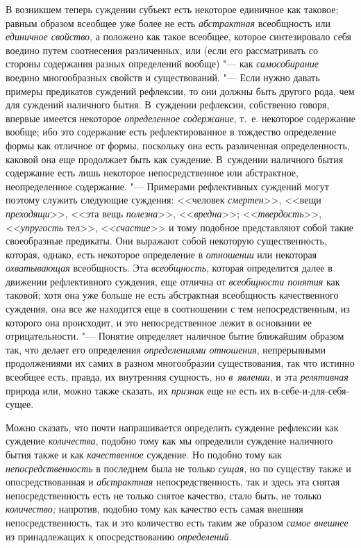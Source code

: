 В возникшем теперь суждении субъект есть некоторое единичное как таковое;
равным образом всеобщее уже более не есть {\em абстрактная} всеобщность или
{\em единичное свойство}, а положено как такое всеобщее, которое синтезировало
себя воедино путем соотнесения различенных, или (если его рассматривать со
стороны содержания разных определений вообще) "--- как {\em самособирание}
воедино многообразных свойств и существований. "--- Если нужно давать примеры
предикатов суждений рефлексии, то они должны быть другого рода, чем для
суждений наличного бытия. В~суждении рефлексии, собственно говоря, впервые
имеется некоторое {\em определенное содержание},
т.~е. некоторое содержание вообще; ибо это содержание есть
рефлектированное в тождество определение формы как отличное от формы,
поскольку она есть различенная определенность, каковой она еще продолжает
быть как суждение. В~суждении наличного бытия содержание есть лишь
некоторое непосредственное или абстрактное, неопределенное содержание. "---
Примерами рефлективных суждений могут поэтому служить следующие суждения:
<<человек {\em смертен}>>, <<вещи {\em преходящи}>>, <<эта вещь
{\em полезна}>>, <<{\em вредна}>>; <<{\em твердость}>>, <<{\em упругость}
тел>>, <<{\em счастие}>> и тому подобное представляют собой такие своеобразные
предикаты. Они выражают собой некоторую существенность, которая, однако, есть
некоторое определение в {\em отношении} или некоторая {\em охватывающая}
всеобщность. Эта {\em всеобщность}, которая определится далее в движении
рефлективного суждения, еще отлична от {\em всеобщности понятия} как таковой;
хотя она уже больше не есть абстрактная всеобщность качественного суждения, она
все же находится еще в соотношении с тем непосредственным, из которого она
происходит, и это непосредственное лежит в основании ее отрицательности. "---
Понятие определяет наличное бытие ближайшим образом так, что делает его
определения {\em определениями отношения}, непрерывными продолжениями их самих
в разном многообразии существования, так что истинно всеобщее есть, правда, их
внутренняя сущность, но {\em в~явлении}, и эта {\em релятивная} природа или,
можно также сказать, их {\em признак} еще не есть их в-себе-и-для-себя-сущее.

Можно сказать, что почти напрашивается определить суждение рефлексии как
суждение {\em количества}, подобно тому как мы определили суждение наличного
бытия также и как {\em качественное} суждение. Но подобно тому как
{\em непосредственность} в последнем была не только {\em сущая}, но по существу
также и опосредствованная и {\em абстрактная} непосредственность, так и здесь
эта снятая непосредственность есть не только снятое качество, стало быть, не
только {\em количество;} напротив, подобно тому как качество есть самая внешняя
непосредственность, так и это количество есть таким же образом
{\em самое внешнее} из принадлежащих к опосредствованию {\em определений}.

